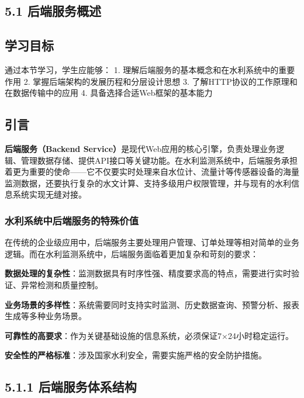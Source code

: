 \subsection{5.1 后端服务概述}\label{ux540eux7aefux670dux52a1ux6982ux8ff0}

\subsection{学习目标}\label{ux5b66ux4e60ux76eeux6807-1}

通过本节学习，学生应能够： 1. 理解后端服务的基本概念和在水利系统中的重要作用 2. 掌握后端架构的发展历程和分层设计思想 3. 了解HTTP协议的工作原理和在数据传输中的应用 4. 具备选择合适Web框架的基本能力

\subsection{引言}\label{ux5f15ux8a00-1}

\textbf{后端服务（Backend Service）}是现代Web应用的核心引擎，负责处理业务逻辑、管理数据存储、提供API接口等关键功能。在水利监测系统中，后端服务承担着更为重要的使命------它不仅要实时处理来自水位计、流量计等传感器设备的海量监测数据，还要执行复杂的水文计算、支持多级用户权限管理，并与现有的水利信息系统实现无缝对接。

\subsubsection{水利系统中后端服务的特殊价值}\label{ux6c34ux5229ux7cfbux7edfux4e2dux540eux7aefux670dux52a1ux7684ux7279ux6b8aux4ef7ux503c}

在传统的企业级应用中，后端服务主要处理用户管理、订单处理等相对简单的业务逻辑。而在水利监测系统中，后端服务面临着更加复杂和苛刻的要求：

\textbf{数据处理的复杂性}：监测数据具有时序性强、精度要求高的特点，需要进行实时验证、异常检测和质量控制。

\textbf{业务场景的多样性}：系统需要同时支持实时监测、历史数据查询、预警分析、报表生成等多种业务场景。

\textbf{可靠性的高要求}：作为关键基础设施的信息系统，必须保证7×24小时稳定运行。

\textbf{安全性的严格标准}：涉及国家水利安全，需要实施严格的安全防护措施。

\subsection{5.1.1 后端服务体系结构}\label{ux540eux7aefux670dux52a1ux4f53ux7cfbux7ed3ux6784}

